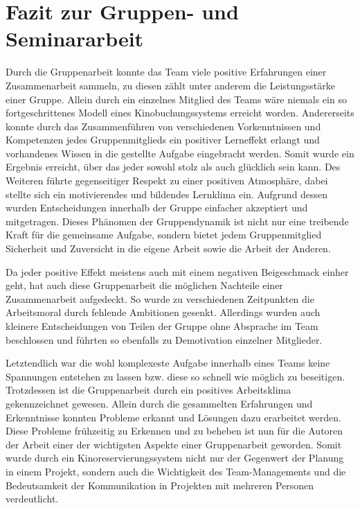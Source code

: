 \section{Fazit zur Gruppen- und Seminararbeit}
\multipleauthorsection{\authorRF}{\authorEJ}

Durch die Gruppenarbeit konnte das Team viele positive Erfahrungen einer Zusammenarbeit sammeln, zu diesen zählt unter anderem die Leistungsstärke einer Gruppe.
Allein durch ein einzelnes Mitglied des Teams wäre niemals ein so fortgeschrittenes Modell eines Kinobuchungssystems erreicht worden.
Andererseits konnte durch das Zusammenführen von verschiedenen Vorkenntnissen und Kompetenzen jedes Gruppenmitglieds ein positiver Lerneffekt erlangt und vorhandenes Wissen in die gestellte Aufgabe eingebracht werden.
Somit wurde ein Ergebnis erreicht, über das jeder sowohl stolz als auch glücklich sein kann.
Des Weiteren führte gegenseitiger Respekt zu einer positiven Atmosphäre, dabei stellte sich ein motivierendes und bildendes Lernklima ein.
Aufgrund dessen wurden Entscheidungen innerhalb der Gruppe einfacher akzeptiert und mitgetragen.
Dieses Phänomen der Gruppendynamik ist nicht nur eine treibende Kraft für die gemeinsame Aufgabe, sondern bietet jedem Gruppenmitglied Sicherheit und Zuversicht in die eigene Arbeit sowie die Arbeit der Anderen.

Da jeder positive Effekt meistens auch mit einem negativen Beigeschmack einher geht, hat auch diese Gruppenarbeit die möglichen Nachteile einer Zusammenarbeit aufgedeckt.
So wurde zu verschiedenen Zeitpunkten die Arbeitsmoral durch fehlende Ambitionen gesenkt.
Allerdings wurden auch kleinere Entscheidungen von Teilen der Gruppe ohne Absprache im Team beschlossen und führten so ebenfalls zu Demotivation einzelner Mitglieder.


Letztendlich war die wohl komplexeste Aufgabe innerhalb eines Teams keine Spannungen entstehen zu lassen bzw. diese so schnell wie möglich zu beseitigen.
Trotzdessen ist die Gruppenarbeit durch ein positives Arbeitsklima gekennzeichnet gewesen.
Allein durch die gesammelten Erfahrungen und Erkenntnisse konnten Probleme erkannt und Lösungen dazu erarbeitet werden.
Diese Probleme frühzeitig zu Erkennen und zu beheben ist nun für die Autoren der Arbeit einer der wichtigsten Aspekte einer Gruppenarbeit geworden.
Somit wurde durch ein Kinoreservierungssystem nicht nur der Gegenwert der Planung in einem Projekt, sondern auch die Wichtigkeit des Team-Managements und die Bedeutsamkeit der Kommunikation in Projekten mit mehreren Personen verdeutlicht.
